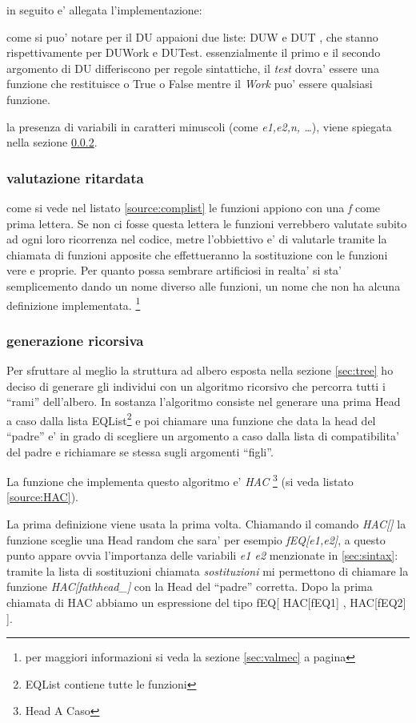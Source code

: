 \documentclass[12pt, a4paper]{article}
\begin{document}
in seguito e' allegata l'implementazione:

\lstset{caption=liste compatibilita',
		label=source:complist}


come si puo' notare per il DU appaioni due liste: DUW e DUT , che stanno rispettivamente per DUWork e DUTest. essenzialmente il primo e il secondo argomento di DU differiscono per regole sintattiche, il {\itshape test} dovra' essere una funzione che restituisce o True o False mentre il {\itshape Work} puo' essere qualsiasi funzione.

la presenza di variabili in caratteri minuscoli (come {\itshape e1,e2,n, \ldots}), viene spiegata nella sezione \ref{sec:generic}.

\subsubsection{valutazione ritardata}
come si vede nel listato \ref{source:complist} le funzioni appiono con una {\itshape f} come prima lettera. Se non ci fosse questa lettera le funzioni verrebbero valutate subito ad ogni loro ricorrenza nel codice, metre l'obbiettivo e' di valutarle tramite la chiamata di funzioni apposite che effettueranno la sostituzione con le funzioni vere e proprie. Per quanto possa sembrare artificiosi in realta' si sta' semplicemento dando un nome diverso alle funzioni, un nome che non ha alcuna definizione implementata. \footnote{per maggiori informazioni si veda la sezione \ref{sec:valmec} a pagina \pageref{sec:valmec}}

\subsubsection{generazione ricorsiva}
\label{sec:generic}
Per sfruttare al meglio la struttura ad albero esposta nella sezione \ref{sec:tree} ho deciso di generare gli individui con un algoritmo ricorsivo che percorra tutti i ``rami'' dell'albero.
In sostanza l'algoritmo consiste nel generare una prima Head a caso dalla lista EQList\footnote{EQList contiene tutte le funzioni} e poi chiamare una funzione che data la head del ``padre''  e' in grado di scegliere un argomento a caso dalla lista di compatibilita' del padre e richiamare se stessa sugli argomenti ``figli''.

La funzione che implementa questo algoritmo e' {\itshape HAC} \footnote{Head A Caso} (si veda listato \ref{source:HAC}).

La prima definizione viene usata la prima volta. Chiamando il comando {\itshape HAC[]} la funzione sceglie una Head random che sara' per esempio {\itshape fEQ[e1,e2]}, a questo punto appare ovvia l'importanza delle variabili {\itshape e1 e2} menzionate in \ref{sec:sintax}: tramite la lista di sostituzioni chiamata {\itshape sostituzioni} mi permettono di chiamare la funzione {\itshape HAC[fathhead\_]} con la Head del ``padre'' corretta. Dopo la prima chiamata di HAC abbiamo un espressione del tipo fEQ[ HAC[fEQ1] , HAC[fEQ2] ]. 
\end{document}
